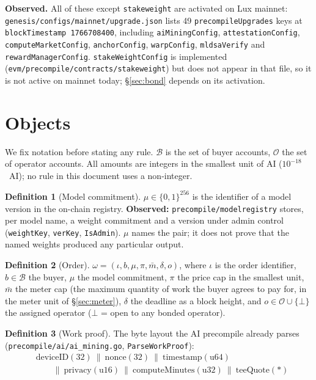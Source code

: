 \documentclass[11pt,a4paper]{article}
\theoremstyle{definition}
\newtheorem{definition}{Definition}[section]
\theoremstyle{remark}
\newcommand{\code}[1]{\texttt{#1}}
\newcommand{\Ord}{\omega}
\newcommand{\Ops}{\mathcal{O}}
\newcommand{\Buyers}{\mathcal{B}}
\begin{document}
\textbf{Observed.} All of these except \code{stakeweight} are activated on Lux
mainnet: \code{genesis/configs/mainnet/upgrade.json} lists 49
\code{precompileUpgrades} keys at \code{blockTimestamp 1766708400}, including
\code{aiMiningConfig}, \code{attestationConfig}, \code{computeMarketConfig},
\code{anchorConfig}, \code{warpConfig}, \code{mldsaVerify} and
\code{rewardManagerConfig}. \code{stakeWeightConfig} is implemented
(\code{evm/precompile/contracts/stakeweight}) but does not appear in that file,
so it is not active on mainnet today; \S\ref{sec:bond} depends on its
activation.

\section{Objects}
\label{sec:objects}

We fix notation before stating any rule. $\Buyers$ is the set of buyer
accounts, $\Ops$ the set of operator accounts. All amounts are integers in the
smallest unit of AI ($10^{-18}$~AI); no rule in this document uses a
non-integer.

\begin{definition}[Model commitment]
$\mu \in \{0,1\}^{256}$ is the identifier of a model version in the on-chain
registry. \textbf{Observed:} \code{precompile/modelregistry} stores, per model
name, a weight commitment and a version under admin control
(\code{weightKey}, \code{verKey}, \code{IsAdmin}). $\mu$ names the pair; it
does not prove that the named weights produced any particular output.
\end{definition}

\begin{definition}[Order]
$\Ord = (\iota, b, \mu, \pi, \bar m, \delta, o)$, where $\iota$ is the order
identifier, $b \in \Buyers$ the buyer, $\mu$ the model commitment, $\pi$ the
price cap in the smallest unit, $\bar m$ the meter cap (the maximum quantity of
work the buyer agrees to pay for, in the meter unit of \S\ref{sec:meter}),
$\delta$ the deadline as a block height, and $o \in \Ops \cup \{\bot\}$ the
assigned operator ($\bot$ = open to any bonded operator).
\end{definition}

\begin{definition}[Work proof]
The byte layout the AI precompile already parses
(\code{precompile/ai/ai\_mining.go}, \code{ParseWorkProof}):
\begin{align*}
&\text{deviceID}(32)\ \|\ \text{nonce}(32)\ \|\ \text{timestamp}(\text{u64})\\
&\qquad \|\ \text{privacy}(\text{u16})\ \|\ \text{computeMinutes}(\text{u32})\ \|\ \text{teeQuote}(\ast)
\end{align*}
\end{definition}
\end{document}
